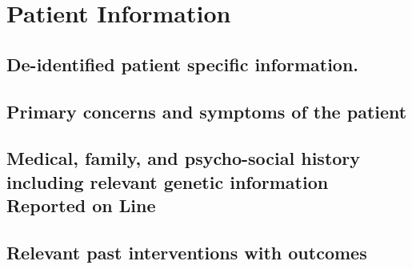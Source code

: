 \section{Patient Information}

\subsection{De-identified patient specific information.}
\subsection{Primary concerns and symptoms of the patient}
\subsection{Medical, family, and psycho-social history including relevant genetic information Reported on Line}
\subsection{Relevant past interventions with outcomes}